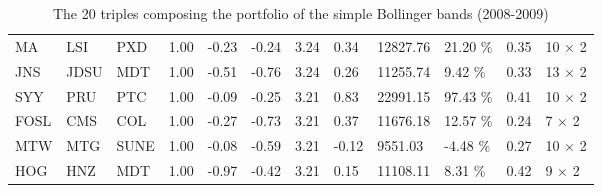 \documentclass[11pt,a4,twosided,singlespacing,titlepagenumber=on]{scrreprt}
\numberwithin{equation}{chapter} %
\theoremstyle{remark}
\begin{document}
\begin{table}[H]
\begin{adjustwidth}{-2.6cm}{}
\begin{tabular}{llllllllllll}
MA  & LSI  & PXD  & 1.00 & -0.23 & -0.24 & 3.24 & 0.34 & 12827.76 & 21.20 \%& 0.35 & 10 $\times$ 2\\
JNS  & JDSU  & MDT  & 1.00 & -0.51 & -0.76 & 3.24 & 0.26 & 11255.74 & 9.42 \%& 0.33 & 13 $\times$ 2\\
SYY  & PRU  & PTC  & 1.00 & -0.09 & -0.25 & 3.21 & 0.83 & 22991.15 & 97.43 \%& 0.41 & 10 $\times$ 2\\
FOSL  & CMS  & COL  & 1.00 & -0.27 & -0.73 & 3.21 & 0.37 & 11676.18 & 12.57 \%& 0.24 & 7 $\times$ 2\\
MTW  & MTG  & SUNE  & 1.00 & -0.08 & -0.59 & 3.21 & -0.12 & 9551.03 & -4.48 \%& 0.27 & 10 $\times$ 2\\
HOG  & HNZ  & MDT  & 1.00 & -0.97 & -0.42 & 3.21 & 0.15 & 11108.11 & 8.31 \%& 0.42 & 9 $\times$ 2\\
\hline
\end{tabular}
\caption{The 20 triples composing the portfolio of the simple Bollinger bands (2008-2009)}
\label{20_selected_triples_simple_bands}
\end{adjustwidth}
\end{table}
\end{document}
